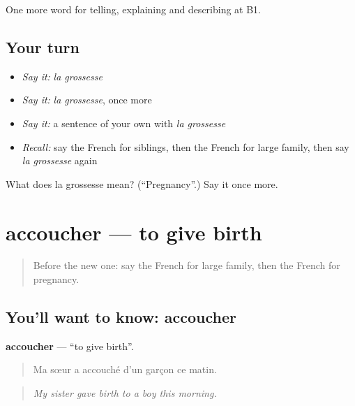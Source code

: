 \begin{grammarlens}[title={What you've built}]
One more word for telling, explaining and describing at B1.
\end{grammarlens}

\subsection*{Your turn}
\begin{itemize}
\raggedright
  \item \emph{Say it:} \emph{la grossesse}
  \item \emph{Say it:} \emph{la grossesse}, once more
  \item \emph{Say it:} a sentence of your own with \emph{la grossesse}
  \item \emph{Recall:} say the French for siblings, then the French for large family, then say \emph{la grossesse} again
\end{itemize}

\begin{tcolorbox}[breakable,colback=teal!4,colframe=teal!35!black,title={Before you move on}]
What does la grossesse mean? (\textquotedblleft{}Pregnancy\textquotedblright{}.) Say it once more.
\end{tcolorbox}
\section[accoucher]{accoucher — to give birth}

\label{lesson:FR-C493-accoucher}



\begin{quote}
Before the new one: say the French for large family, then the French for pregnancy.
\end{quote}

\subsection*{You'll want to know: accoucher}
\textbf{accoucher} — \textquotedblleft{}to give birth\textquotedblright{}.

\begin{quote}
Ma sœur a accouché d'un garçon ce matin.
\end{quote}

\begin{quote}
\emph{My sister gave birth to a boy this morning.}
\end{quote}

